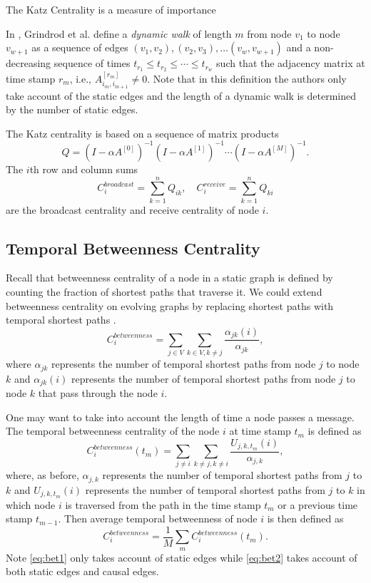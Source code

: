 \documentclass[12pt]{article}
\theoremstyle{definition}
\begin{document}
The Katz Centrality is a measure of importance

In \cite{grindrod11}, Grindrod et al. define a \emph{dynamic walk} of length $m$ from
node $v_1$ to node $v_{w+1}$  as a sequence of edges
$(v_1, v_2), (v_2, v_3), \ldots (v_w, v_{w+1})$ and a non-decreasing sequence of times
$t_{r_1} \leq t_{r_2} \leq \cdots \leq t_{r_w}$ such that the adjacency matrix at time stamp
$r_m$, i.e., $A_{i_m, i_{m+1}}^{[r_m]} \ne 0$. Note that in this definition the authors only take account of the static edges and the length of a dynamic walk is determined by the number of static edges.

The Katz centrality is based on a sequence of matrix products
\begin{equation}
\label{eq:katz}
Q = (I - \alpha A^{[0]})^{-1}(I - \alpha A^{[1]})^{-1} \cdots (I - \alpha A^{[M]})^{-1}.
\end{equation}
The $i$th row and column sums
$$
C_i^{broadcast} = \sum_{k=1}^n Q_{ik}, \quad C_i^{receive} = \sum_{k=1}^n Q_{ki}
$$
are the broadcast centrality and receive centrality of node $i$.

\subsection{Temporal Betweenness Centrality}
\label{sec:temp-betw-centr}

Recall that betweenness centrality of a node in a static graph is defined by counting the fraction of shortest paths that traverse it.
We could extend
betweenness centrality on evolving graphs by replacing shortest paths with temporal shortest paths \cite{nicosia13}.
\begin{equation}
  \label{eq:bet1}
C_i^{betweenness} = \sum_{j \in V}\sum_{k \in V, k \ne j}\frac{\alpha_{jk}(i)}{\alpha_{jk}},
\end{equation}
where $\alpha_{jk}$ represents the number of temporal shortest paths from node $j$ to node $k$ and $\alpha_{jk}(i)$ represents the number of temporal shortest paths from node $j$ to node $k$ that pass through the node $i$.

One may want to take into account the length of time a node passes a message. The temporal betweenness centrality of the node $i$ at time stamp $t_m$ is defined as
\begin{equation}
  \label{eq:bet2}
  C_i^{betweenness}(t_m) = \sum_{j\ne i}\sum_{k\ne j, k\ne i}\frac{U_{j,k,t_m}(i)}{\alpha_{j,k}},
\end{equation}
where, as before, $\alpha_{j,k}$ represents the number of temporal shortest paths from $j$ to $k$ and $U_{j,k,t_m}(i)$ represents the number of temporal shortest paths from $j$ to $k$ in which node $i$ is traversed from
the path in the time stamp $t_m$ or a previous time stamp $t_{m-1}$. Then
average temporal betweenness of node $i$ is then defined as
$$
  C_i^{betweenness} = \frac{1}{M}\sum_m C_i^{betweenness}(t_m).
$$
Note \eqref{eq:bet1} only takes account of static edges while \eqref{eq:bet2} takes account of both static edges and causal edges.
\end{document}
